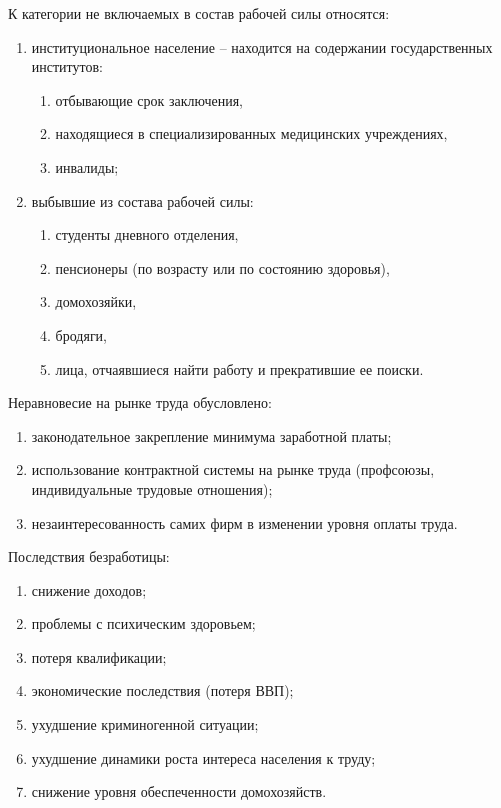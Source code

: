 К категории не включаемых в состав рабочей силы относятся:
\begin{enumerate}
    \item институциональное население -- находится на содержании государственных
    институтов:
    \begin{enumerate}
        \item отбывающие срок заключения,
        \item находящиеся в специализированных медицинских учреждениях,
        \item инвалиды;
    \end{enumerate}
    \item выбывшие из состава рабочей силы:
    \begin{enumerate}
        \item студенты дневного отделения,
        \item пенсионеры (по возрасту или по состоянию здоровья),
        \item домохозяйки,
        \item бродяги,
        \item лица, отчаявшиеся найти работу и прекратившие ее поиски.
    \end{enumerate}
\end{enumerate}

Неравновесие на рынке труда обусловлено:
\begin{enumerate}
    \item законодательное закрепление минимума заработной платы;
    \item использование контрактной системы на рынке труда (профсоюзы,
    индивидуальные трудовые отношения);
    \item незаинтересованность самих фирм в изменении уровня оплаты труда.
\end{enumerate}

Последствия безработицы:
\begin{enumerate}
    \item снижение доходов;
    \item проблемы с психическим здоровьем;
    \item потеря квалификации;
    \item экономические последствия (потеря ВВП);
    \item ухудшение криминогенной ситуации;
    \item ухудшение динамики роста интереса населения к труду;
    \item снижение уровня обеспеченности домохозяйств.
\end{enumerate}

